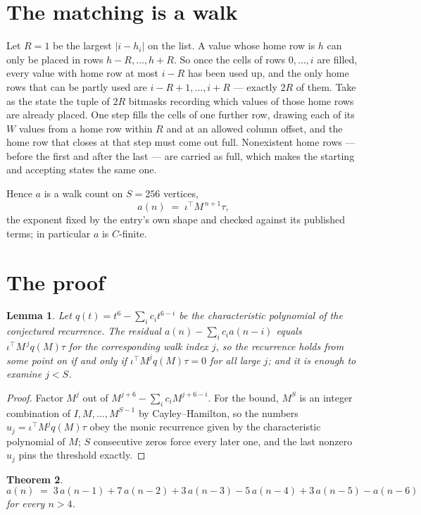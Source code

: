 \documentclass[11pt,a4paper]{article}
\theoremstyle{plain}
\newtheorem{theorem}{Theorem}
\newtheorem{lemma}[theorem]{Lemma}
\theoremstyle{definition}
\begin{document}
\section{The matching is a walk}

Let $R=1$ be the largest $|i-h_i|$ on the list. A value whose home row is $h$ can only be
placed in rows $h-R,\dots,h+R$. So once the cells of rows $0,\dots,i$ are filled, every
value with home row at most $i-R$ has been used up, and the only home rows that can be
partly used are $i-R+1,\dots,i+R$ --- exactly $2R$ of them. Take as the state the tuple of
$2R$ bitmasks recording which values of those home rows are already placed. One step fills
the cells of one further row, drawing each of its $W$ values from a home row within $R$
and at an allowed column offset, and the home row that closes at that step must come out
full. Nonexistent home rows --- before the first and after the last --- are carried as
full, which makes the starting and accepting states the same one.

Hence $a$ is a walk count on $S=256$ vertices,
\[
a(n)\;=\;\iota^{\!\top}M^{\,n+1}\tau ,
\]
the exponent fixed by the entry's own shape and checked against its published terms; in
particular $a$ is $C$-finite.

\section{The proof}

\begin{lemma}\label{lem:crit}
Let $q(t)=t^{6}-\sum_i c_it^{6-i}$ be the characteristic polynomial of the
conjectured recurrence. The residual $a(n)-\sum_ic_ia(n-i)$ equals
$\iota^{\!\top}M^{\,j}q(M)\tau$ for the corresponding walk index $j$, so the recurrence
holds from some point on if and only if $\iota^{\!\top}M^{j}q(M)\tau=0$ for all large $j$;
and it is enough to examine $j<S$.
\end{lemma}

\begin{proof}
Factor $M^{j}$ out of $M^{j+6}-\sum_ic_iM^{j+6-i}$. For the bound, $M^{S}$
is an integer combination of $I,M,\dots,M^{S-1}$ by Cayley--Hamilton, so the numbers
$u_j=\iota^{\!\top}M^{j}q(M)\tau$ obey the monic recurrence given by the characteristic
polynomial of $M$; $S$ consecutive zeros force every later one, and the last nonzero $u_j$
pins the threshold exactly.
\end{proof}

\begin{theorem}
\[
a(n)\;=\;3\,a(n-1) + 7\,a(n-2) + 3\,a(n-3) - 5\,a(n-4) + 3\,a(n-5) - a(n-6)
\]
for every $n>4$.
\end{theorem}
\end{document}
